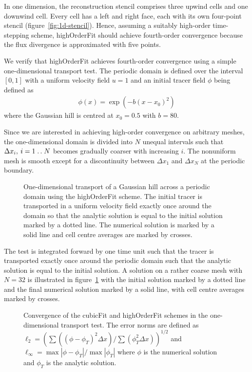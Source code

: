 \documentclass[a4paper,11pt]{article}
\newcommand{\isep}{\mathrel{{.}\,{.}}\nobreak}
\begin{document}
In one dimension, the reconstruction stencil comprises three upwind cells and one downwind cell.
Every cell has a left and right face, each with its own four-point stencil (figure~\ref{fig:1d-stencil}).
Hence, assuming a suitably high-order time-stepping scheme, highOrderFit should achieve fourth-order convergence because the flux divergence is approximated with five points.

We verify that highOrderFit achieves fourth-order convergence using a simple one-dimensional transport test.  The periodic domain is defined over the interval $[0,1]$ with a uniform velocity field $u = 1$ and an initial tracer field $\phi$ being defined as
\begin{align}
	\phi(x) = \exp \left( -b \left( x - x_0 \right)^2 \right)
\end{align}
where the Gaussian hill is centred at $x_0 = 0.5$ with $b = 80$.

Since we are interested in achieving high-order convergence on arbitrary meshes, the one-dimensional domain is divided into $N$ unequal intervals such that $\Delta x_i, \: i = 1\isep N$ becomes gradually coarser with increasing $i$.  The nonuniform mesh is smooth except for a discontinuity between $\Delta x_1$ and $\Delta x_N$ at the periodic boundary.

\begin{figure}
	\centering
	
	\caption{One-dimensional transport of a Gaussian hill across a periodic domain using the highOrderFit scheme.  The initial tracer is transported in a uniform velocity field exactly once around the domain so that the analytic solution is equal to the initial solution marked by a dotted line.  The numerical solution is marked by a solid line and cell centre averages are marked by crosses.}
	\label{fig:advect1D-tracer}
\end{figure}

The test is integrated forward by one time unit such that the tracer is transported exactly once around the periodic domain such that the analytic solution is equal to the initial solution.  A solution on a rather coarse mesh with $N = 32$ is illustrated in figure~\ref{fig:advect1D-tracer} with the initial solution marked by a dotted line and the final numerical solution marked by a solid line, with cell centre averages marked by crosses.

\begin{figure}
	\centering
	
	\caption{Convergence of the cubicFit and highOrderFit schemes in the one-dimensional transport test.
	The error norms are defined as $\ell_2 = \left( \sum \left( \left( \phi - \phi_T \right)^2 \Delta x \right) / \sum \left( \phi_T^2 \Delta x \right)\right)^{1/2}$ and $\ell_\infty = \max \left| \phi - \phi_T \right| / \max \left| \phi_T \right|$ where $\phi$ is the numerical solution and $\phi_T$ is the analytic solution.}
	\label{fig:advect1D-convergence}
\end{figure}
\end{document}
